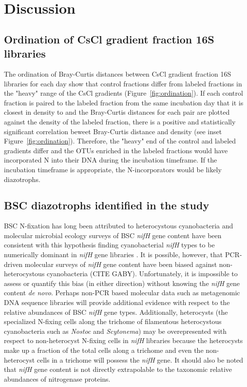 \section{Discussion}

\subsection{Ordination of CsCl gradient fraction 16S libraries}
The ordination of Bray-Curtis distances between CsCl gradient fraction 16S
libraries for each day show that control fractions differ from labeled
fractions in the "heavy" range of the CsCl gradients
(Figure~\ref{fig:ordination}). If each control fraction is paired to the
labeled fraction from the same incubation day that it is closest in density to
and the Bray-Curtis distances for each pair are plotted against the density of
the labeled fraction, there is a positive and statistically significant
correlation beweet Bray-Curtis distance and density (see inset
Figure~\ref{fig:ordination}).  Therefore, the "heavy" end of the control and
labeled gradients differ and the
OTUs enriched in the labeled fractions would have incorporated N into their DNA
during the incubation timeframe. If the incubation timeframe is appropriate,
the N-incorporators would be likely diazotrophs.     

\subsection{BSC diazotrophs identified in the study}
BSC N-fixation has long been attributed to heterocystous cyanobacteria and molecular microbial ecology surveys of BSC \textit{nifH} gene content have been consistent with this hypothesis finding cyanobacterial \textit{nifH} types to be numerically dominant in \textit{nifH} gene libraries \cite{Yeager,14766579,Yeager_2012}. It is possible, however, that PCR-driven molecular surveys of \textit{nifH} gene content have been biased against non-heterocystous cyanobacteria (CITE GABY). Unfortunately, it is impossible to assess or quantify this bias (in either direction) without knowing the \textit{nifH} gene content \textit{de novo}. Perhaps non-PCR based molecular data such as metagenomic DNA sequence libraries will provide additional evidence with respect to the relative abundances of BSC \textit{nifH} gene types. Additionally, heterocysts (the specialized N-fixing cells along the trichome of filamentous heterocystous cyanobacteria such as \textit{Nostoc} and \textit{Scytonema}) may be overepresented with respect to non-heterocyst N-fixing cells in \textit{nifH} libraries because the heterocysts make up a fraction of the total cells along a trichome and even the non-heterocyst cells in a trichome will possess the \textit{nifH} gene. It should also be noted that \textit{nifH} gene content is not directly extrapolable to the taxonomic relative abundances of nitrogenase proteins.

